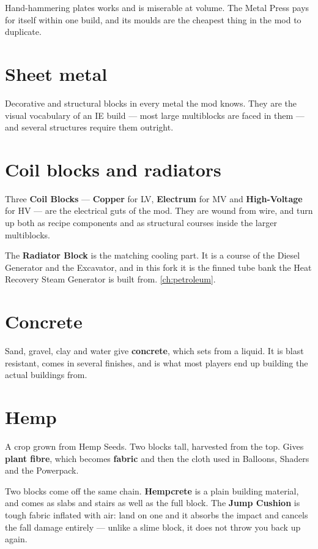 \begin{ietip}
Hand-hammering plates works and is miserable at volume. The Metal Press pays for itself within one
build, and its moulds are the cheapest thing in the mod to duplicate.
\end{ietip}

\section{Sheet metal}

Decorative and structural blocks in every metal the mod knows. They are the visual vocabulary of an
IE build --- most large multiblocks are faced in them --- and several structures require them
outright.

\section{Coil blocks and radiators}

Three \textbf{Coil Blocks} --- \textbf{Copper} for LV, \textbf{Electrum} for MV and
\textbf{High-Voltage} for HV --- are the electrical guts of the mod. They are wound from wire, and
turn up both as recipe components and as structural courses inside the larger multiblocks.

The \textbf{Radiator Block} is the matching cooling part. It is a course of the Diesel Generator and
the Excavator, and in this fork it is the finned tube bank the Heat Recovery Steam Generator is
built from. \autoref{ch:petroleum}.

\section{Concrete}

Sand, gravel, clay and water give \textbf{concrete}, which sets from a liquid. It is blast
resistant, comes in several finishes, and is what most players end up building the actual buildings
from.

\section{Hemp}

A crop grown from Hemp Seeds. Two blocks tall, harvested from the top. Gives \textbf{plant fibre},
which becomes \textbf{fabric} and then the cloth used in Balloons, Shaders and the Powerpack.

Two blocks come off the same chain. \textbf{Hempcrete} is a plain building material, and comes as
slabs and stairs as well as the full block. The \textbf{Jump Cushion} is tough fabric inflated with
air: land on one and it absorbs the impact and cancels the fall damage entirely --- unlike a slime
block, it does not throw you back up again.

